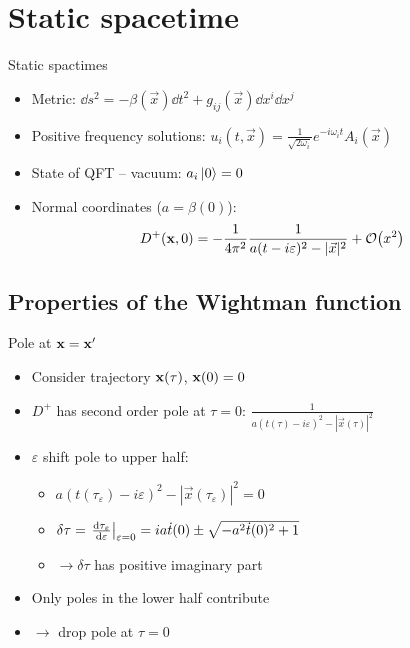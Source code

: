 \documentclass{beamer}
\renewcommand{\va}[1]{\vec{#1}}
\begin{document}
\section{Static spacetime}
\begin{frame}{Static spactimes}
\begin{itemize}
	\item Metric: \(\dd{s^2} = -\beta(\va{x}) \dd{t^2} + g_{ij}(\va{x}) \dd{x^i} \dd{x^j}\)
	\item Positive frequency solutions: \(u_{i}(t, \va{x}) = \frac{1}{\sqrt{2\omega_i}}e^{-i\omega_i t} A_i(\va{x})\)
	\item State of QFT -- vacuum: \(a_i \ket*{0} = 0\)
	\item Normal coordinates (\(a = \beta(0)\)): \[D^+(\vb{x},0) = -\frac{1}{4\pi^2} \frac{1}{a(t-i\varepsilon)^2 - |\va{x}|^2} + \order{x^2}\]
\end{itemize}
\end{frame}

\subsection{Properties of the Wightman function}
\begin{frame}{Pole at \(\vb{x} = \vb{x}'\)}
\begin{itemize}
	\item Consider trajectory \(\vb{x}(\tau)\), \(\vb{x}(0) = 0\)
	\item \(D^+\) has second order pole at \(\tau = 0\): \(\frac{1}{a(t(\tau)-i\varepsilon)^2 - |\va{x}(\tau)|^2}\)
	\item \(\varepsilon\) shift pole to upper half:
	\begin{itemize}
		\item \(a(t(\tau_\varepsilon)-i\varepsilon)^2 - |\va{x}(\tau_\varepsilon)|^2 = 0\)
		\item \(\delta\tau = \eval{\dv{\tau_\varepsilon}{\varepsilon}}_{\varepsilon = 0} = ia\dot{t}(0) \pm \sqrt{-a^2 \dot{t}(0)^2 + 1}\)
		\item[] \(\to \delta\tau\) has positive imaginary part
	\end{itemize}
	\item Only poles in the lower half contribute 
	\item[] \(\to\) drop pole at \(\tau = 0\)
\end{itemize}
\end{frame}
\end{document}
